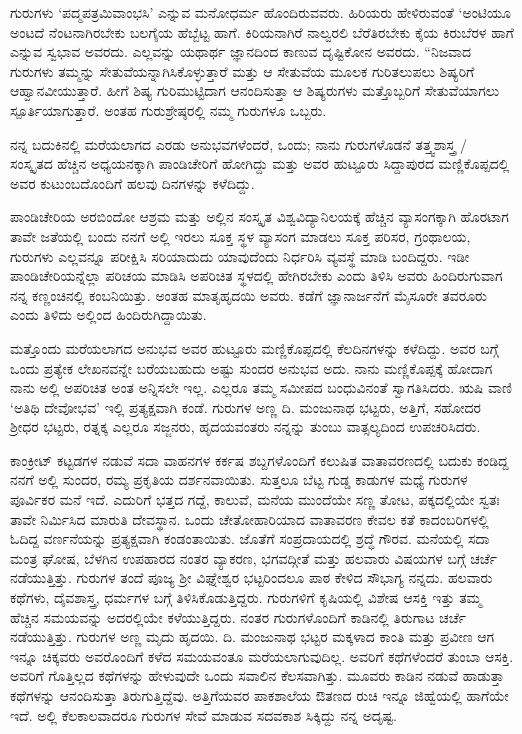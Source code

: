 {ಗುರುಗಳು ‘ಪದ್ಮಪತ್ರಮಿವಾಂಭಸಿ’ ಎನ್ನುವ ಮನೋಧರ್ಮ ಹೊಂದಿರುವವರು. ಹಿರಿಯರು ಹೇಳಿರುವಂತೆ ‘ಅಂಟಿಯೂ ಅಂಟದೆ ನೆಂಟನಾಗಿರಬೇಕು ಬಲಗೈಯ ಹೆಬ್ಬೆಟ್ಟ ಹಾಗೆ. ಕಿರಿಯನಾಗಿರೆ ನಾಲ್ವರಲಿ ಬೆರೆತಿರಬೇಕು ಕೈಯ ಕಿರುಬೆರಳ ಹಾಗೆ ಎನ್ನುವ ಸ್ವಭಾವ ಅವರದು. ಎಲ್ಲವನ್ನು ಯಥಾರ್ಥ ಜ್ಞಾನದಿಂದ ಕಾಣುವ ದೃಷ್ಟಿಕೋನ ಅವರದು. “ನಿಜವಾದ ಗುರುಗಳು ತಮ್ಮನ್ನು ಸೇತುವೆಯನ್ನಾಗಿಸಿಕೊಳ್ಳುತ್ತಾರೆ ಮತ್ತು ಆ ಸೇತುವೆಯ ಮೂಲಕ ಗುರಿತಲುಪಲು ಶಿಷ್ಯರಿಗೆ ಆಹ್ವಾನವೀಯುತ್ತಾರೆ. ಹೀಗೆ ಶಿಷ್ಯ ಗುರಿಮುಟ್ಟಿದಾಗ ಆನಂದಿಸುತ್ತಾ ಆ ಶಿಷ್ಯರುಗಳು ಮತ್ತೊಬ್ಬರಿಗೆ ಸೇತುವೆಯಾಗಲು ಸ್ಪೂರ್ತಿಯಾಗುತ್ತಾರೆ. ಅಂತಹ ಗುರುಶ್ರೇಷ್ಠರಲ್ಲಿ ನಮ್ಮ ಗುರುಗಳೂ ಒಬ್ಬರು.

ನನ್ನ ಬದುಕಿನಲ್ಲಿ ಮರೆಯಲಾಗದ ಎರಡು ಅನುಭವಗಳೆಂದರೆ, ಒಂದು; ನಾನು ಗುರುಗಳೊಡನೆ ತತ್ತ್ವಶಾಸ್ತ್ರ / ಸಂಸ್ಕೃತದ ಹೆಚ್ಚಿನ ಅಧ್ಯಯನಕ್ಕಾಗಿ ಪಾಂಡಿಚೇರಿಗೆ ಹೋಗಿದ್ದು ಮತ್ತು ಅವರ ಹುಟ್ಟೂರು ಸಿದ್ದಾಪುರದ ಮಣ್ಣಿಕೊಪ್ಪದಲ್ಲಿ ಅವರ ಕುಟುಂಬದೊಂದಿಗೆ ಹಲವು ದಿನಗಳನ್ನು ಕಳೆದಿದ್ದು.

ಪಾಂಡಿಚೇರಿಯ ಅರಬಿಂದೋ ಆಶ್ರಮ ಮತ್ತು ಅಲ್ಲಿನ ಸಂಸ್ಕೃತ ವಿಶ್ವವಿದ್ಯಾನಿಲಯಕ್ಕೆ ಹೆಚ್ಚಿನ ವ್ಯಾಸಂಗಕ್ಕಾಗಿ ಹೊರಟಾಗ ತಾವೇ ಜತೆಯಲ್ಲಿ ಬಂದು ನನಗೆ ಅಲ್ಲಿ ಇರಲು ಸೂಕ್ತ ಸ್ಥಳ ವ್ಯಾಸಂಗ ಮಾಡಲು ಸೂಕ್ತ ಪರಿಸರ, ಗ್ರಂಥಾಲಯ, ಗುರುಗಳು ಎಲ್ಲವನ್ನೂ ಪರೀಕ್ಷಿಸಿ ಸರಿಯಾದುದು ಯಾವುದೆಂದು ನಿರ್ಧರಿಸಿ ವ್ಯವಸ್ಥೆ ಮಾಡಿ ಬಂದಿದ್ದರು. ಇಡೀ ಪಾಂಡಿಚೇರಿಯನ್ನೆಲ್ಲಾ ಪರಿಚಯ ಮಾಡಿಸಿ ಅಪರಿಚಿತ ಸ್ಥಳದಲ್ಲಿ ಹೇಗಿರಬೇಕು ಎಂದು ತಿಳಿಸಿ ಅವರು ಹಿಂದಿರುಗುವಾಗ ನನ್ನ ಕಣ್ಣಂಚಿನಲ್ಲಿ ಕಂಬನಿಯಿತ್ತು. ಅಂತಹ ಮಾತೃಹೃದಯಿ ಅವರು. ಕಡೆಗೆ ಜ್ಞಾನಾರ್ಜನೆಗೆ ಮೈಸೂರೇ ತವರೂರು ಎಂದು ತಿಳಿದು ಅಲ್ಲಿಂದ ಹಿಂದಿರುಗಿದ್ದಾಯಿತು.

ಮತ್ತೊಂದು ಮರೆಯಲಾಗದ ಅನುಭವ ಅವರ ಹುಟ್ಟೂರು ಮಣ್ಣಿಕೊಪ್ಪದಲ್ಲಿ ಕೆಲದಿನಗಳನ್ನು ಕಳೆದಿದ್ದು. ಅವರ ಬಗ್ಗೆ ಒಂದು ಪ್ರತ್ಯೇಕ ಲೇಖನವನ್ನೇ ಬರೆಯಬಹುದು ಅಷ್ಟು ಸುಂದರ ಅನುಭವ ಅದು. ನಾನು ಮಣ್ಣಿಕೊಪ್ಪಕ್ಕೆ ಹೋದಾಗ ನಾನು ಅಲ್ಲಿ ಅಪರಿಚಿತ ಅಂತ ಅನ್ನಿಸಲೇ ಇಲ್ಲ. ಎಲ್ಲರೂ ತಮ್ಮ ಸಮೀಪದ ಬಂಧುವಿನಂತೆ ಸ್ವಾಗತಿಸಿದರು. ಋಷಿ ವಾಣಿ ‘ಅತಿಥಿ ದೇವೋಭವ’ ಇಲ್ಲಿ ಪ್ರತ್ಯಕ್ಷವಾಗಿ ಕಂಡೆ. ಗುರುಗಳ ಅಣ್ಣ ದಿ. ಮಂಜುನಾಥ ಭಟ್ಟರು, ಅತ್ತಿಗೆ, ಸಹೋದರ ಶ್ರೀಧರ ಭಟ್ಟರು, ರತ್ನಕ್ಕ ಎಲ್ಲರೂ ಸಜ್ಜನರು, ಹೃದಯವಂತರು ನನ್ನನ್ನು ತುಂಬು ವಾತ್ಸಲ್ಯದಿಂದ ಉಪಚರಿಸಿದರು.

ಕಾಂಕ್ರೀಟ್ ಕಟ್ಟಡಗಳ ನಡುವೆ ಸದಾ ವಾಹನಗಳ ಕರ್ಕಷ ಶಬ್ದಗಳೊಂದಿಗೆ ಕಲುಷಿತ ವಾತಾವರಣದಲ್ಲಿ ಬದುಕು ಕಂಡಿದ್ದ ನನಗೆ ಅಲ್ಲಿ ಸುಂದರ, ರಮ್ಯ ಪ್ರಕೃತಿಯ ದರ್ಶನವಾಯಿತು. ಸುತ್ತಲೂ ಬೆಟ್ಟ  \enginline{-}  ಗುಡ್ಡ ಕಾಡುಗಳ ಮಧ್ಯೆ ಗುರುಗಳ ಪೂರ್ವಿಕರ ಮನೆ ಇದೆ. ಎದುರಿಗೆ ಭತ್ತದ ಗದ್ದೆ, ಕಾಲುವೆ, ಮನೆಯ ಮುಂದೆಯೇ ಸಣ್ಣ ತೋಟ, ಪಕ್ಕದಲ್ಲಿಯೇ ಸ್ವತಃ ತಾವೇ ನಿರ್ಮಿಸಿದ ಮಾರುತಿ ದೇವಸ್ಥಾನ. ಒಂದು ಚೇತೋಹಾರಿಯಾದ ವಾತಾವರಣ ಕೇವಲ ಕತೆ ಕಾದಂಬರಿಗಳಲ್ಲಿ ಓದಿದ್ದ ವರ್ಣನೆಯನ್ನು ಪ್ರತ್ಯಕ್ಷವಾಗಿ ಕಂಡಂತಾಯಿತು. ಜೊತೆಗೆ ಸಂಪ್ರದಾಯದಲ್ಲಿ ಶ್ರದ್ಧೆ ಗೌರವ. ಮನೆಯಲ್ಲಿ ಸದಾ ಮಂತ್ರ ಘೋಷ, ಬೆಳಗಿನ ಉಪಹಾರದ ನಂತರ ವ್ಯಾಕರಣ, ಭಗವದ್ಗೀತೆ ಮತ್ತು ಹಲವಾರು ವಿಷಯಗಳ ಬಗ್ಗೆ ಚರ್ಚೆ ನಡೆಯುತ್ತಿತ್ತು. ಗುರುಗಳ ತಂದೆ ಪೂಜ್ಯ ಶ್ರೀ ವಿಘ್ನೇಶ್ವರ ಭಟ್ಟರಿಂದಲೂ ಪಾಠ ಕೇಳಿದ ಸೌಭಾಗ್ಯ ನನ್ನದು. ಹಲವಾರು ಕಥೆಗಳು, ದೈವಶಾಸ್ತ್ರ, ಧರ್ಮಗಳ ಬಗ್ಗೆ ತಿಳಿಸಿಕೊಡುತ್ತಿದ್ದರು. ಗುರುಗಳಿಗೆ ಕೃಷಿಯಲ್ಲಿ ವಿಶೇಷ ಆಸಕ್ತಿ ಇತ್ತು ತಮ್ಮ ಹೆಚ್ಚಿನ ಸಮಯವನ್ನು ಅದರಲ್ಲಿಯೇ ಕಳೆಯುತ್ತಿದ್ದರು. ನಂತರ ಗುರುಗಳೊಂದಿಗೆ ಕಾಡಿನಲ್ಲಿ ತಿರುಗಾಟ ಚರ್ಚೆ ನಡೆಯುತ್ತಿತ್ತು. ಗುರುಗಳ ಅಣ್ಣ ಮೃದು ಹೃದಯಿ. ದಿ. ಮಂಜುನಾಥ ಭಟ್ಟರ ಮಕ್ಕಳಾದ ಕಾಂತಿ ಮತ್ತು ಪ್ರವೀಣ ಆಗ ಇನ್ನೂ ಚಿಕ್ಕವರು ಅವರೊಂದಿಗೆ ಕಳೆದ ಸಮಯವಂತೂ ಮರೆಯಲಾಗುವುದಿಲ್ಲ. ಅವರಿಗೆ ಕಥೆಗಳೆಂದರೆ ತುಂಬಾ ಆಸಕ್ತಿ. ಅವರಿಗೆ ಗೊತ್ತಿಲ್ಲದ ಕಥೆಗಳನ್ನು ಹೇಳುವುದೇ ಒಂದು ಸವಾಲಿನ ಕೆಲಸವಾಗಿತ್ತು. ಮೂವರು ಕಾಡಿನ ನಡುವೆ ಹಾಡುತ್ತಾ ಕಥೆಗಳನ್ನು ಆನಂದಿಸುತ್ತಾ ತಿರುಗುತ್ತಿದ್ದೆವು. ಅತ್ತಿಗೆಯವರ ಪಾಕಶಾಲೆಯ ಔತಣದ ರುಚಿ ಇನ್ನೂ ಜಿಹ್ವೆಯಲ್ಲಿ ಹಾಗೆಯೇ ಇದೆ. ಅಲ್ಲಿ ಕೆಲಕಾಲವಾದರೂ ಗುರುಗಳ ಸೇವೆ ಮಾಡುವ ಸದವಕಾಶ ಸಿಕ್ಕಿದ್ದು ನನ್ನ ಅದೃಷ್ಟ.

}

